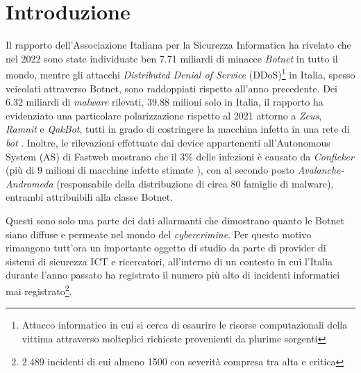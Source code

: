 
\chapter{Introduzione}
Il rapporto dell'Associazione Italiana per la Sicurezza Informatica \cite{Clusit} ha rivelato che nel 2022 sono state individuate ben 7.71 miliardi di minacce \textit{Botnet} in tutto il mondo, mentre gli attacchi \textit{Distributed Denial of Service} (DDoS)\footnote{Attacco informatico in cui si cerca di esaurire le risorse computazionali della vittima attraverso molteplici richieste provenienti da plurime sorgenti} in Italia, spesso veicolati attraverso Botnet, sono raddoppiati rispetto all'anno precedente. Dei 6.32 miliardi di \textit{malware} rilevati, 39.88 milioni solo in Italia, il rapporto ha evidenziato una particolare polarizzazione rispetto al 2021 attorno a \textit{Zeus}, \textit{Ramnit} e \textit{QakBot}, tutti in grado di costringere la macchina infetta in una rete di \textit{bot} \cite{FSecureLabsBlogRamnit,CisaQakBot,KaskerkyZeus,IBMSecBlogRamnit}. Inoltre, le rilevazioni effettuate dai device appartenenti all’Autonomous System (AS) di Fastweb mostrano che il 3\% delle infezioni è causato da \textit{Conficker} (più di 9 milioni di macchine infette stimate \cite{FSecureLabsBlogConfickersData}), con al secondo posto \textit{Avalanche-Andromeda} (responsabile della distribuzione di circa 80 famiglie di malware), entrambi attribuibili alla classe Botnet.

Questi sono solo una parte dei dati allarmanti che dimostrano quanto le Botnet siano diffuse e permeate nel mondo del \textit{cybercrimine}. Per questo motivo rimangono tutt’ora un importante oggetto di studio da parte di provider di sistemi di sicurezza ICT e ricercatori, all’interno di un contesto in cui l’Italia durante l’anno passato ha registrato il numero più alto di incidenti informatici mai registrato\footnote{2.489 incidenti di cui almeno 1500 con severità compresa tra alta e critica}.

